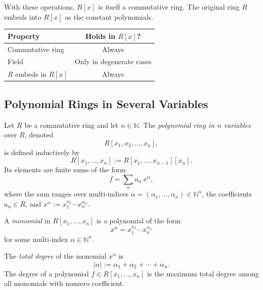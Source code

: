 \begin{remark}
With these operations, $R[x]$ is itself a commutative ring.
The original ring $R$ embeds into $R[x]$ as the constant polynomials.

\begin{center}
\begin{tabular}{l|c}
Property & Holds in $R[x]$? \\
\hline
Commutative ring & Always \\
Field & Only in degenerate cases \\
$R$ embeds in $R[x]$ & Always
\end{tabular}
\end{center}
\end{remark}

\subsection*{Polynomial Rings in Several Variables}

\begin{definition}
Let $R$ be a commutative ring and let $n \in \mathbb{N}$.
The \emph{polynomial ring in $n$ variables} over $R$, denoted
\[
R[x_1, x_2, \dots, x_n],
\]
is defined inductively by
\[
R[x_1, \dots, x_n] := R[x_1, \dots, x_{n-1}][x_n].
\]
Its elements are finite sums of the form
\[
f = \sum_{\alpha} a_\alpha \, x^\alpha,
\]
where the sum ranges over multi-indices
$\alpha = (\alpha_1, \dots, \alpha_n) \in \mathbb{N}^n$,
the coefficients $a_\alpha \in R$, and
$x^\alpha := x_1^{\alpha_1} \cdots x_n^{\alpha_n}$.
\end{definition}

\begin{definition}[Monomial]
A \emph{monomial} in $R[x_1, \dots, x_n]$ is a polynomial
of the form
\[
x^\alpha = x_1^{\alpha_1} \cdots x_n^{\alpha_n}
\]
for some multi-index $\alpha \in \mathbb{N}^n$.
\end{definition}

\begin{definition}
The \emph{total degree} of the monomial $x^\alpha$ is
\[
|\alpha| := \alpha_1 + \alpha_2 + \cdots + \alpha_n.
\]
The degree of a polynomial $f \in R[x_1,\dots,x_n]$ is
the maximum total degree among all monomials with nonzero coefficient.
\end{definition}

